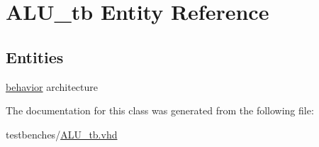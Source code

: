 \hypertarget{class_a_l_u__tb}{\section{\-A\-L\-U\-\_\-tb \-Entity \-Reference}
\label{class_a_l_u__tb}
}
\subsection*{\-Entities}
\begin{DoxyCompactItemize}
\item 
\hyperlink{class_a_l_u__tb_1_1behavior}{behavior} architecture
\end{DoxyCompactItemize}


\-The documentation for this class was generated from the following file\-:\begin{DoxyCompactItemize}
\item 
testbenches/\hyperlink{_a_l_u__tb_8vhd}{\-A\-L\-U\-\_\-tb.\-vhd}\end{DoxyCompactItemize}
